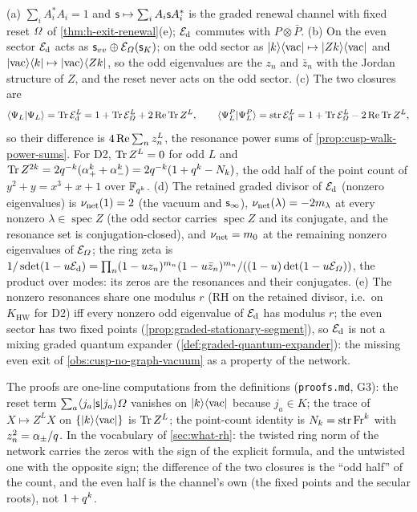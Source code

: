 \begin{theorem}
\label{thm:renewal-graded-mps}
(a) $\sum_iA_i^{*}A_i = 1$ and $\mathsf s\mapsto\sum_iA_i\mathsf s A_i^{*}$ is the graded renewal channel with fixed reset
$\varOmega$ of \cref{thm:h-exit-renewal}(e); $\mathcal E_{\mathrm d}$ commutes with $P\otimes\bar P$. (b) On the even sector $\mathcal E_{\mathrm d}$ acts as
$\mathsf s_{vv}\oplus\mathcal E_{\varOmega}(\mathsf s_K)$; on the odd sector as $|k\rangle\langle\mathrm{vac}|\mapsto|Zk\rangle\langle\mathrm{vac}|$
and $|\mathrm{vac}\rangle\langle k|\mapsto|\mathrm{vac}\rangle\langle Zk|$, so the odd eigenvalues are the $z_n$ and $\bar z_n$
with the Jordan structure of $Z$, and the reset never acts on the odd sector. (c) The two closures are
\[
\langle\Psi_{L}|\Psi_{L}\rangle = \operatorname{Tr}\mathcal E_{\mathrm d}^L = 1+\operatorname{Tr}\mathcal E_{\varOmega}^L+2\operatorname{Re}\operatorname{Tr} Z^L,\qquad
\langle\Psi_{L}^P|\Psi_{L}^P\rangle = \operatorname{str}\mathcal E_{\mathrm d}^L = 1+\operatorname{Tr}\mathcal E_{\varOmega}^L-2\operatorname{Re}\operatorname{Tr} Z^L ,
\]
so their difference is $4\operatorname{Re}\sum_nz_n^L$, the resonance power sums of \cref{prop:cusp-walk-power-sums}. For D2,
$\operatorname{Tr} Z^L = 0$ for odd $L$ and $\operatorname{Tr} Z^{2k} = 2q^{-k}(\alpha_{+}^k+\alpha_{-}^k) = 2q^{-k}(1+q^k-N_{k})$,
the odd half of the point count of $y^2+y = x^3+x+1$ over $\mathbb F_{q^{k}}$. (d) The retained graded divisor of $\mathcal E_{\mathrm d}$ (nonzero
eigenvalues) is $\nu_{\mathrm{net}}(1) = 2$ (the vacuum and $\mathsf s_\infty$), $\nu_{\mathrm{net}}(\lambda) = -2m_\lambda$ at every nonzero
$\lambda\in\operatorname{spec}Z$ (the odd sector carries $\operatorname{spec}Z$ and its conjugate, and the
resonance set is conjugation-closed), and $\nu_{\mathrm{net}} = m_0$ at the remaining nonzero eigenvalues of
$\mathcal E_{\varOmega}$; the ring zeta is
$1/\operatorname{sdet}(1-u\mathcal E_{\mathrm d}) = \prod_n(1-u z_n)^{m_n}(1-u\bar z_n)^{m_n}/((1-u)\det(1-u\mathcal E_{\varOmega}))$, the product
over modes: its zeros are the resonances and their conjugates. (e) The nonzero resonances share one modulus $r$
(RH on the retained divisor, i.e.\ on $K_{\mathrm{HW}}$ for D2) iff every nonzero odd eigenvalue of $\mathcal E_{\mathrm d}$ has
modulus $r$; the even sector has two fixed points (\cref{prop:graded-stationary-segment}), so
$\mathcal E_{\mathrm d}$ is not a mixing graded quantum expander (\cref{def:graded-quantum-expander}): the missing even exit of
\cref{obs:cusp-no-graph-vacuum} as a property of the network.
\end{theorem}

The proofs are one-line computations from the definitions (\texttt{proofs.md}, G3): the reset term
$\sum_a\langle j_a|\mathsf s|j_a\rangle\varOmega$ vanishes on $|k\rangle\langle\mathrm{vac}|$ because $j_a\in K$; the trace of
$X\mapsto Z^LX$ on $\{|k\rangle\langle\mathrm{vac}|\}$ is $\operatorname{Tr} Z^L$; the point-count identity is
$N_{k} = \operatorname{str}\mathrm{Fr}^k$ with $z_n^2 = \alpha_{\pm}/q$. In the vocabulary of \cref{sec:what-rh}: the twisted ring
norm of the network carries the zeros with the sign of the explicit formula, and the untwisted one with the
opposite sign; the difference of the two closures is the ``odd half'' of the count, and the even half is the
channel's own (the fixed points and the secular roots), not $1+q^k$.

